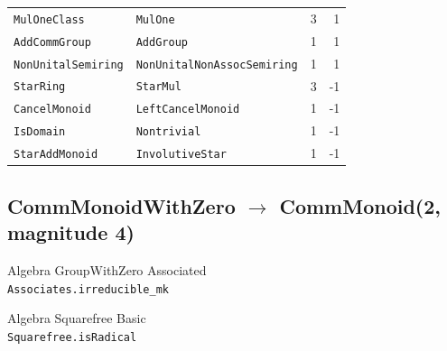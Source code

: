 \documentclass[10pt,a4paper]{article}
\begin{document}
\begin{center}
\begin{tabular}{llrr}
\texttt{\small MulOneClass} & \texttt{\small MulOne} & 3 & 1\\
\texttt{\small AddCommGroup} & \texttt{\small AddGroup} & 1 & 1\\
\texttt{\small NonUnitalSemiring} & \texttt{\small NonUnitalNonAssocSemiring} & 1 & 1\\
\texttt{\small StarRing} & \texttt{\small StarMul} & 3 & -1\\
\texttt{\small CancelMonoid} & \texttt{\small LeftCancelMonoid} & 1 & -1\\
\texttt{\small IsDomain} & \texttt{\small Nontrivial} & 1 & -1\\
\texttt{\small StarAddMonoid} & \texttt{\small InvolutiveStar} & 1 & -1\\
\end{tabular}
\end{center}

\subsection*{CommMonoidWithZero $\to$ CommMonoid\quad\textmd{\small (2, magnitude 4)}}
{\footnotesize\color{locator}Algebra\,\textperiodcentered\,GroupWithZero\,\textperiodcentered\,Associated}\\
\hspace*{1em}\texttt{\small Associates.\allowbreak{}irreducible\_mk}\\

{\footnotesize\color{locator}Algebra\,\textperiodcentered\,Squarefree\,\textperiodcentered\,Basic}\\
\hspace*{1em}\texttt{\small Squarefree.\allowbreak{}isRadical}\\
\end{document}
